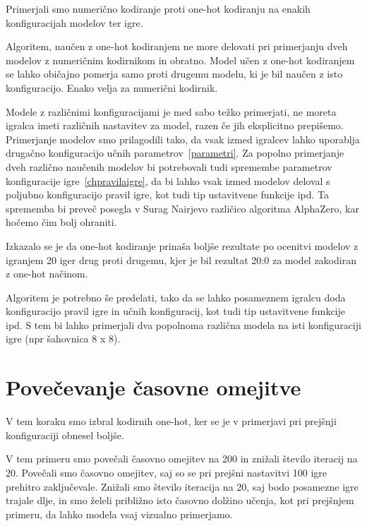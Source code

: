 \documentclass[a4paper, 12pt]{book}
\begin{document}
Primerjali smo numerično kodiranje proti one-hot kodiranju na enakih konfiguracijah modelov ter igre.

Algoritem, naučen z one-hot kodiranjem ne more delovati pri primerjanju dveh modelov z numeričnim kodirnikom in obratno. 
Model učen z one-hot kodiranjem se lahko običajno pomerja samo proti drugemu modelu, ki je bil naučen z isto konfiguracijo.
Enako velja za numerični kodirnik.

Modele z različnimi konfiguracijami je med sabo težko primerjati, ne moreta igralca imeti različnih nastavitev za model, razen če jih eksplicitno prepišemo.
Primerjanje modelov smo prilagodili tako, da vsak izmed igralcev lahko uporablja drugačno konfiguracijo učnih parametrov~\ref{parametri}.
Za popolno primerjanje dveh različno naučenih modelov bi potrebovali tudi spremembe parametrov konfiguracije igre~\ref{chpravilaigre}, da bi lahko vsak izmed modelov deloval s poljubno konfiguracijo pravil igre, kot tudi tip ustavitvene funkcije ipd.
Ta sprememba bi preveč posegla v Surag Nairjevo različico algoritma AlphaZero, kar hočemo čim bolj ohraniti.

Izkazalo se je da one-hot kodiranje prinaša boljše rezultate po ocenitvi modelov z igranjem 20 iger drug proti drugemu, kjer je bil rezultat 20:0 za model zakodiran z one-hot načinom.

Algoritem je potrebno še predelati, tako da se lahko posameznem igralcu doda konfiguracijo pravil igre in učnih konfiguracij, kot tudi tip ustavitvene funkcije ipd.
S tem bi lahko primerjali dva popolnoma različna modela na isti konfiguraciji igre (npr šahovnica 8 x 8).

\section{Povečevanje časovne omejitve}
\label{resultSecond}
V tem koraku smo izbral kodirnih one-hot, ker se je v primerjavi pri prejšnji konfiguraciji obnesel boljše.

V tem primeru smo povečali časovno omejitev na 200 in znižali število iteracij na 20.
Povečali smo časovno omejitev, saj so se pri prejšni nastavitvi 100 igre prehitro zaključevale.
Znižali smo število iteracija na 20, saj bodo posamezne igre trajale dlje, in smo želeli približno isto časovno dolžino učenja, kot pri prejšnjem primeru, da lahko modela vsaj vizualno primerjamo.
\end{document}
